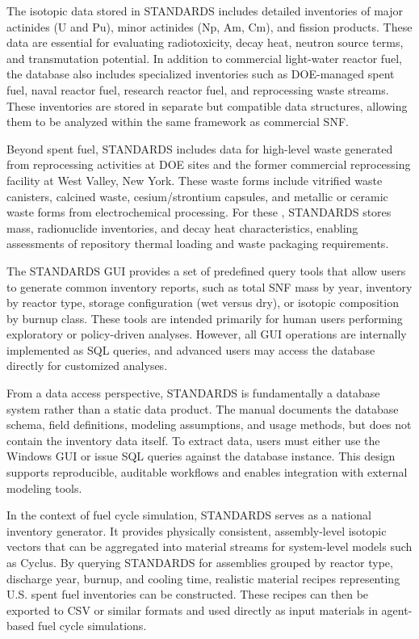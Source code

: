 The isotopic data stored in STANDARDS includes detailed inventories of major actinides (U and Pu), minor actinides (Np, Am, Cm), 
and fission products. These data are essential for evaluating radiotoxicity, decay heat, neutron source terms, and transmutation 
potential. In addition to commercial light-water reactor fuel, the database also includes specialized inventories such as 
DOE-managed spent fuel, naval reactor fuel, research reactor fuel, and reprocessing waste streams. These inventories are 
stored in separate but compatible data structures, allowing them to be analyzed within the same framework as commercial SNF.

Beyond spent fuel, STANDARDS includes data for high-level waste generated from reprocessing activities at DOE sites and the 
former commercial reprocessing facility at West Valley, New York. These waste forms include vitrified waste canisters, 
calcined waste, cesium/strontium capsules, and metallic or ceramic waste forms from electrochemical processing. For these 
\materials, STANDARDS stores mass, radionuclide inventories, and decay heat characteristics, enabling assessments of repository 
thermal loading and waste packaging requirements.

The STANDARDS GUI provides a set of predefined query tools that allow users to generate common inventory reports, such as 
total SNF mass by year, inventory by reactor type, storage configuration (wet versus dry), or isotopic composition by burnup class. 
These tools are intended primarily for human users performing exploratory or policy-driven analyses. However, all GUI operations 
are internally implemented as SQL queries, and advanced users may access the database directly for customized analyses.

From a data access perspective, STANDARDS is fundamentally a database system rather than a static data product. The manual 
documents the database schema, field definitions, modeling assumptions, and usage methods, but does not contain the inventory data 
itself. To extract data, users must either use the Windows GUI or issue SQL queries against the database instance. This design 
supports reproducible, auditable workflows and enables integration with external modeling tools.

In the context of fuel cycle simulation, STANDARDS serves as a national inventory generator. It provides physically consistent, 
assembly-level isotopic vectors that can be aggregated into material streams for system-level models such as Cyclus. By querying 
STANDARDS for assemblies grouped by reactor type, discharge year, burnup, and cooling time, realistic material recipes 
representing U.S. spent fuel inventories can be constructed. These recipes can then be exported to CSV or similar formats and 
used directly as input materials in agent-based fuel cycle simulations.


